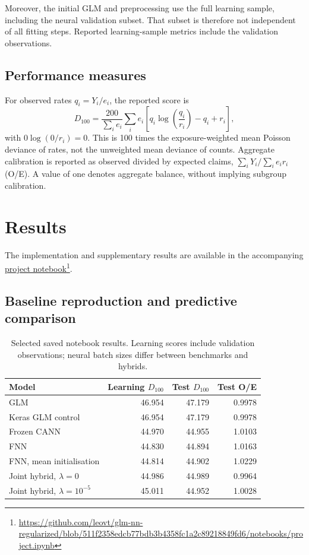 \documentclass[a4paper]{article}
\begin{document}
Moreover, the initial GLM and preprocessing use the full learning sample,
including the neural validation subset.
That subset is therefore not independent of all fitting steps.
Reported learning-sample metrics include the validation observations.

\subsection{Performance measures}
For observed rates $q_i=Y_i/e_i$, the reported score is
\[
 D_{100}=\frac{200}{\sum_i e_i}\sum_i e_i
 \left[q_i\log\left(\frac{q_i}{r_i}\right)-q_i+r_i\right],
\]
with $0\log(0/r_i)=0$.
This is 100 times the exposure-weighted mean Poisson deviance of rates,
not the unweighted mean deviance of counts.
Aggregate calibration is reported as observed divided by expected claims,
$\sum_iY_i/\sum_i e_i r_i$ (O/E).
A value of one denotes aggregate balance, without implying subgroup
calibration.


\section{Results}
The implementation and supplementary results are available in the accompanying
\href{https://github.com/leovt/glm-nn-regularized/blob/511f2358edcb77bdb3b4358fc1a2c89218849fd6/notebooks/project.ipynb}{project notebook}\footnote{\url{https://github.com/leovt/glm-nn-regularized/blob/511f2358edcb77bdb3b4358fc1a2c89218849fd6/notebooks/project.ipynb}}.
\subsection{Baseline reproduction and predictive comparison}
\begin{table}[htbp]
    \centering
\begin{tabular}{lrrr}
\hline
Model & Learning $D_{100}$ & Test $D_{100}$ & Test O/E\\
\hline
GLM & 46.954 & 47.179 & 0.9978\\
Keras GLM control & 46.954 & 47.179 & 0.9978\\
Frozen CANN & 44.970 & 44.955 & 1.0103\\
FNN & 44.830 & 44.894 & 1.0163\\
FNN, mean initialisation & 44.814 & 44.902 & 1.0229\\
Joint hybrid, $\lambda=0$ & 44.986 & 44.989 & 0.9964\\
Joint hybrid, $\lambda=10^{-5}$ & 45.011 & 44.952 & 1.0028\\
\hline
\end{tabular}
\caption{Selected saved notebook results. Learning scores include validation
observations; neural batch sizes differ between benchmarks and hybrids.}
\label{tab:comparison}
\end{table}
\end{document}
